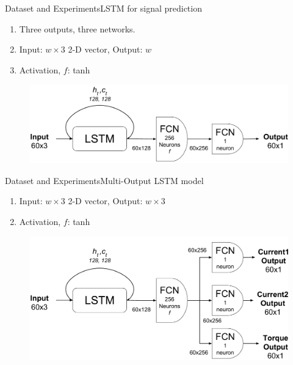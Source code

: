 \documentclass[handout]{beamer}
\begin{document}
\begin{frame}{Dataset and Experiments}{LSTM for signal prediction}
  \begin{enumerate}
    \item Three outputs, three networks.
    \item Input: $w\times3$ 2-D vector, Output: $w$
    \item Activation, $f$: tanh
  \end{enumerate}
  \begin{center}
    \begin{figure}
    \includegraphics[scale=0.35]{images/motor_lstm}
    \end{figure}
  \end{center}
\end{frame}

\begin{frame}{Dataset and Experiments}{Multi-Output LSTM model}
\begin{enumerate}
  \item Input: $w\times3$ 2-D vector, Output: $w\times3$
  \item Activation, $f$: tanh
\end{enumerate}
\begin{center}
  \begin{figure}
  \includegraphics[scale=0.35]{images/motor_comb_lstm}
  \end{figure}
\end{center}
\end{frame}
\end{document}
